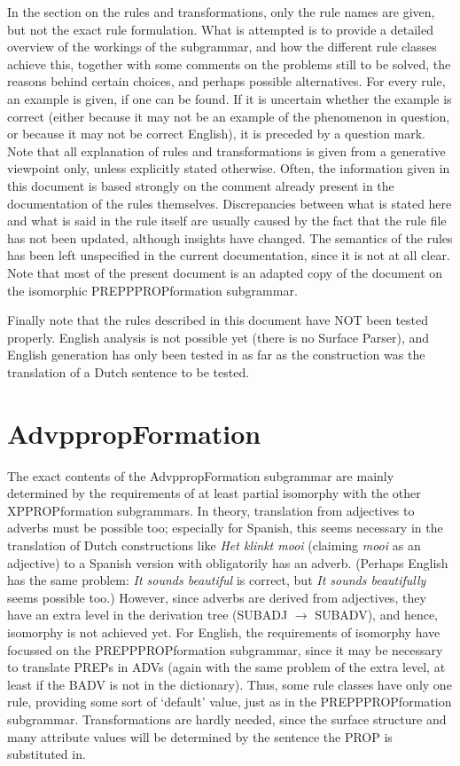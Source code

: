 In the section on the rules and transformations, only the rule names are given, 
but not the exact rule formulation. What is attempted 
is to provide a detailed overview of the workings of the subgrammar, and 
how the different rule classes achieve this,
together with some comments on the problems still to be solved, the reasons 
behind certain choices, and perhaps possible alternatives. For every rule, an 
example is given, if one can be found. If 
it is uncertain whether the example is correct (either 
because it may not be an example of the phenomenon in question, or because it 
may not be correct English), it is preceded by a question mark. Note that all 
explanation of rules and transformations is given from a generative viewpoint
only, unless explicitly stated otherwise. Often, the information given in this 
document is based strongly on the comment already present in the documentation 
of the rules themselves. Discrepancies between what is stated here and what is 
said in the rule itself are usually caused by the fact that the rule file has 
not  been updated, although insights have changed. The semantics of the rules 
has been left unspecified in the current documentation, since it is not at all 
clear. Note that most of the present document is an adapted copy of the 
document on the isomorphic PREPPPROPformation subgrammar.

Finally note that the rules described in this document have NOT been tested 
properly. English analysis is not possible yet (there is no Surface Parser), and 
English generation has only been tested in as far as the construction was the 
translation of a Dutch sentence to be tested.

\newpage
\section{AdvppropFormation}
The exact contents of the AdvppropFormation subgrammar are mainly determined 
by the requirements of at least partial
isomorphy with the other XPPROPformation subgrammars. In theory, translation 
from adjectives to adverbs must be possible too; especially for Spanish, this 
seems necessary in the translation of Dutch constructions like {\em Het klinkt 
mooi\/} (claiming {\em mooi\/} as an adjective) to a Spanish version with 
obligatorily has an adverb. (Perhaps English has the same problem: {\em It 
sounds beautiful\/} is correct, but {\em It sounds beautifully\/} seems 
possible too.) However, since adverbs are derived from adjectives, they have an 
extra level in the derivation tree (SUBADJ $\rightarrow$ SUBADV), and hence, 
isomorphy is not achieved yet. For English, the requirements of isomorphy have 
focussed on the PREPPPROPformation subgrammar, since it may be necessary to 
translate PREPs in ADVs (again with the same problem of the extra level, at 
least if the BADV is not in the dictionary).
Thus, some rule classes have only one rule, providing some sort of 
`default' value, just as in the PREPPPROPformation subgrammar. 
Transformations are hardly needed, since the surface structure 
and many attribute values will be determined by the sentence the PROP is 
substituted in. 

